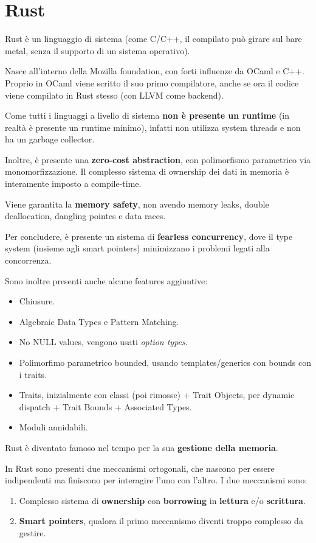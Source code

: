 \documentclass{article}
\begin{document}
\pagestyle{empty}

\section*{Rust}
\large

Rust è un linguaggio di sistema (come C/C++, il compilato può girare sul bare metal, senza il supporto di un sistema operativo).

Nasce all'interno della Mozilla foundation, con forti influenze da OCaml e C++. Proprio in OCaml viene scritto il suo primo compilatore, anche se ora il codice viene compilato in Rust stesso (con LLVM come backend).

Come tutti i linguaggi a livello di sistema \textbf{non è presente un runtime} (in realtà è presente un runtime minimo), infatti non utilizza system threads e non ha un garbage collector.

Inoltre, è presente una \textbf{zero-cost abstraction}, con polimorfismo parametrico via monomorfizzazione. Il complesso sistema di ownership dei dati in memoria è interamente imposto a compile-time.

Viene garantita la \textbf{memory safety}, non avendo memory leaks, double deallocation, dangling pointes e data races.

Per concludere, è presente un sistema di \textbf{fearless concurrency}, dove il type system (insieme agli smart pointers) minimizzano i problemi legati alla concorrenza.

Sono inoltre presenti anche alcune features aggiuntive:
\begin{itemize}
    \item Chiusure.
    \item Algebraic Data Types e Pattern Matching.
    \item No NULL values, vengono usati \textit{option types}.
    \item Polimorfimo parametrico bounded, usando templates/generics con bounds con i traits.
    \item Traits, inizialmente con classi (poi rimosse) + Trait Objects, per dynamic dispatch + Trait Bounds + Associated Types.
    \item Moduli annidabili.
\end{itemize}
\vspace{14pt}
Rust è diventato famoso nel tempo per la sua \textbf{gestione della memoria}.

In Rust sono presenti due meccanismi ortogonali, che nascono per essere indipendenti ma finiscono per interagire l'uno con l'altro. I due meccanismi sono:
\begin{enumerate}
    \item Complesso sistema di \textbf{ownership} con \textbf{borrowing} in \textbf{lettura} e/o \textbf{scrittura}.
    \item \textbf{Smart pointers}, qualora il primo meccanismo diventi troppo complesso da gestire.
\end{enumerate}
\end{document}
